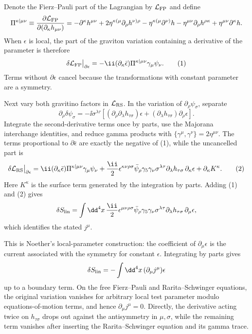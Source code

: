 
\begin{enumerate}
  Denote the Fierz--Pauli part of the Lagrangian by \(\mathcal L_{\rm FP}\)
  and define
  \[
    \Pi^{\kappa\mid\mu\nu}
      \equiv\frac{\partial\mathcal L_{\rm FP}}
                   {\partial(\partial_\kappa h_{\mu\nu})}
      =-\partial^\kappa h^{\mu\nu}
       +2\eta^{\kappa(\mu}\partial_\rho h^{\nu)\rho}
       -\eta^{\kappa(\mu}\partial^{\nu)}h
       -\eta^{\mu\nu}\partial_\rho h^{\rho\kappa}
       +\eta^{\mu\nu}\partial^\kappa h .
  \]
  When \(\epsilon\) is local, the part of the graviton variation containing
  a derivative of the parameter is therefore
  \[
    \delta\mathcal L_{\rm FP}\big|_{\partial\epsilon}
      =-\ii(\partial_\kappa\bar\epsilon)
        \Pi^{\kappa\mid\mu\nu}\gamma_\mu\psi_\nu .
    \tag{1}
  \]
  Terms without \(\partial\epsilon\) cancel because the transformations
  with constant parameter are a symmetry.

  Next vary both gravitino factors in \(\mathcal L_{\rm RS}\).  In the
  variation of \(\partial_\rho\psi_\sigma\), separate
  \[
    \partial_\rho\delta\psi_\sigma
      =-\ii\sigma^{\lambda\tau}
       \left[(\partial_\rho\partial_\lambda h_{\tau\sigma})\epsilon
       +(\partial_\lambda h_{\tau\sigma})\partial_\rho\epsilon\right].
  \]
  Integrate the second-derivative terms once by parts, use the Majorana
  interchange identities, and reduce gamma products with
  \(\{\gamma^\mu,\gamma^\nu\}=2\eta^{\mu\nu}\).  The terms proportional to
  \(\partial\bar\epsilon\) are exactly the negative of (1), while the
  uncancelled part is
  \[
    \delta\mathcal L_{\rm RS}\big|_{\partial\epsilon}
      =\ii(\partial_\kappa\bar\epsilon)
        \Pi^{\kappa\mid\mu\nu}\gamma_\mu\psi_\nu
       +\frac{\ii}{2}\epsilon^{\kappa\nu\rho\sigma}
        \bar\psi_\rho\gamma_5\gamma_\nu\sigma^{\lambda\tau}
        \partial_\lambda h_{\tau\sigma}\,\partial_\kappa\epsilon
       +\partial_\kappa K^\kappa .
    \tag{2}
  \]
  Here \(K^\kappa\) is the surface term generated by the integration by
  parts.  Adding (1) and (2) gives
  \[
    \delta S_{\rm lin}
      =\int \dd^4x\,
        \frac{\ii}{2}\epsilon^{\mu\nu\rho\sigma}
        \bar\psi_\rho\gamma_5\gamma_\nu\sigma^{\lambda\tau}
        \partial_\lambda h_{\tau\sigma}\,\partial_\mu\epsilon,
  \]
  which identifies the stated \(j^\mu\).

  This is Noether's local-parameter construction: the coefficient of
  \(\partial_\mu\epsilon\) is the current associated with the symmetry for
  constant \(\epsilon\).  Integrating by parts gives
  \[
    \delta S_{\rm lin}
      =-\int \dd^4x\,(\partial_\mu j^\mu)\epsilon
  \]
  up to a boundary term.  On the free Fierz--Pauli and Rarita--Schwinger
  equations, the original variation vanishes for arbitrary local test
  parameter modulo equations-of-motion terms, and hence
  \(\partial_\mu j^\mu=0\).  Directly, the derivative acting twice on
  \(h_{\tau\sigma}\) drops out against the antisymmetry in
  \(\mu,\sigma\), while the remaining term vanishes after inserting the
  Rarita--Schwinger equation and its gamma trace.


\end{enumerate}
